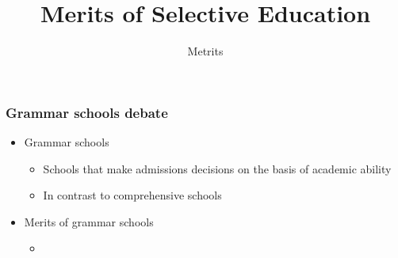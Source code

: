 \documentclass{beamer}
\title{Merits of Selective Education}
\subtitle{Metrits }
\begin{document}
\begin{spacing}{1.3}

\frame{\titlepage}

\begin{frame}
	\frametitle{Grammar schools debate}
	\begin{itemize}
		\item Grammar schools
		\begin{itemize}
			\item Schools that make admissions decisions on the basis of academic ability
			\item In contrast to comprehensive schools
		\end{itemize}
		\item Merits of grammar schools
		\begin{itemize}
			\item 

		\end{itemize}
	\end{itemize}
\end{frame}

\begin{frame}

\end{frame}
\end{spacing}
\end{document}
